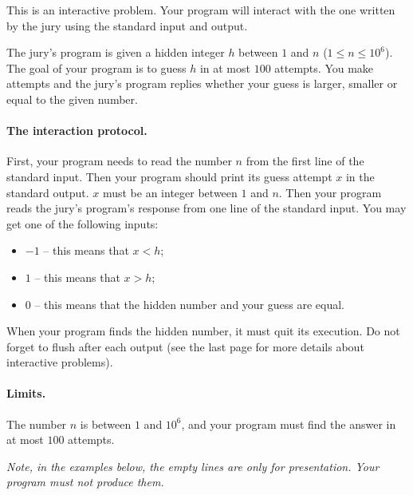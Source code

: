 This is an interactive problem.
Your program will interact with the one written by the jury using the standard input and output.

The jury’s program is given a hidden integer $h$ between $1$ and $n$ ($1 \leq n \leq 10^6$).
The goal of your program is to guess $h$ in at most $100$ attempts.
You make attempts and the jury's program replies whether your guess is larger, smaller or equal to the given number.

\paragraph{The interaction protocol.}
First, your program needs to read the number $n$ from the first line of the standard input.
Then your program should print its guess attempt $x$ in the standard output.
$x$ must be an integer between $1$ and $n$.
Then your program reads the jury’s program’s response from one line of the standard input.
You may get one of the following inputs:
\begin{itemize}
    \item $-1$ -- this means that $x < h$;
    \item $1$ -- this means that $x > h$;
    \item $0$ -- this means that the hidden number and your guess are equal.
\end{itemize}
When your program finds the hidden number, it must quit its execution.
Do not forget to flush after each output (see the last page for more details about interactive problems).

\paragraph{Limits.}
The number $n$ is between $1$ and $10^6$, and your program must find the answer in at most $100$ attempts.

\emph{Note, in the examples below, the empty lines are only for presentation.
Your program must not produce them.}
{
\renewcommand{\sampleinputname}{Jury's feedback}
\renewcommand{\sampleoutputname}{Your attempts}
}
